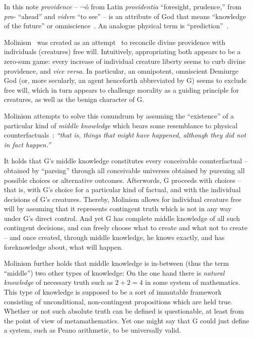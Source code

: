 \documentclass[%
  twocolumn,
 showpacs,
 showkeys,
 preprintnumbers,
 amsmath,amssymb,
 aps,
  pra,
  longbibliography,
 ]{revtex4-1}
\begin{document}
In this note  {\em providence} -- ¬ó from Latin  {\it providentia}  ``foresight, prudence,'' from
{\it pro-}  ``ahead'' and {\it videre}  ``to see'' -- is an attribute of God that means ``knowledge of the future''
or omniscience~\cite{sep-providence-divine}. An analogue physical term is ``prediction''~\cite{specker-60,acs-2015-info6040773}.

Molinism~\cite{book:502563,book:1310279} %
was created as an attempt~\cite{Flint-2009} to reconcile divine providence with individuals (creatures) free will.
Intuitively, appropriating both appears to be a zero-sum game:
every increase of individual creature liberty seems to curb divine providence, and {\it vice versa}.
In particular, an omnipotent, omniscient Demiurge God (or, more secularly, an agent henceforth abbreviated by G) seems to exclude free will,
which in turn appears to challenge morality as a guiding principle for creatures,
as well as the benign character of G.

Molinism attempts to solve this conundrum by assuming the ``existence'' of a particular kind of
{\em middle knowledge} which bears some resemblance to physical
counterfactuals~\cite[p.~240]{penrose-oliver-70}:
{\em ``that is, things that might have happened, although they did not in fact happen.''}

It holds that G's middle knowledge constitutes  every conceivable counterfactual --
obtained by ``parsing'' through all conceivable universes obtained by pursuing all possible choices or alternative outcomes.
Afterwords, G proceeds with choices -- that is, with G's choice for a particular kind of factual, and with the individual decisions of G's creatures.
Thereby, Molinism allows for individual creature free will by assuming that it represents contingent truth which is not in any way under G's direct control.
And yet G has complete middle knowledge of all such contingent decisions, and can freely choose what to create and what not to create
-- and once created, through middle knowledge, he knows exactly, and has foreknowledge about, what will happen.

Molinism further holds that middle knowledge is  in-between (thus the term ``middle'') two other types of knowledge:
On the one hand there is {\em natural knowledge} of necessary truth such as $2+2=4$ in some system of mathematics.
This type of knowledge is supposed to be a sort of immutable framework consisting of unconditional, non-contingent propositions which are held true.
Whether or not such absolute truth can be defined is questionable, at least from the point of view of metamathematics. Yet one might say that
G could just define a system, such as Peano arithmetic, to be universally valid.
\end{document}
